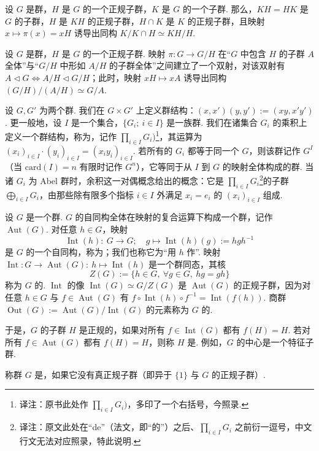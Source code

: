 \begin{proposition}\label{prop:fg-1-1-11}
设 $G$ 是群，$H$ 是 $G$ 的一个正规子群，$K$ 是 $G$ 的一个子群. 那么，$KH=HK$ 是 $G$ 的子群，$H$ 是 $KH$ 的正规子群，$H\cap K$ 是 $K$ 的正规子群，且映射 $x\mapsto\pi(x)=xH$ 诱导出同构 $K/K\cap H\simeq KH/H$.
\end{proposition}

\begin{proposition}\label{prop:fg-1-1-12}
设 $G$ 是群，$H$ 是 $G$ 的一个正规子群. 映射 $\pi:G\to G/H$ 在``$G$ 中包含 $H$ 的子群 $A$ 全体''与``$G/H$ 中形如 $A/H$ 的子群全体''之间建立了一个双射，对该双射有 $A\triangleleft G\Leftrightarrow A/H\triangleleft G/H$；此时，映射 $xH\mapsto xA$ 诱导出同构 $(G/H)/(A/H)\simeq G/A$.
\end{proposition}

\begin{numpara}[直积与直和]\label{np:fg-1-1-13}
设 $G,G'$ 为两个群. 我们在 $G\times G'$ 上定义群结构：$(x,x')(y,y'):=(xy,x'y')$. 更一般地，设 $I$ 是一个集合，$\{G_i;\ i\in I\}$ 是一族群. 我们在诸集合 $G_i$ 的乘积上定义一个群结构，称为，记作 $\prod_{i\in I}G_i)$\footnote{译注：原书此处作 $\prod_{i\in I}G_i)$，多印了一个右括号，今照录.}，其运算为 $(x_i)_{i\in I}\cdot(y_i)_{i\in I}=(x_iy_i)_{i\in I}$. 若所有的 $G_i$ 都等于同一个 $G$，则该群记作 $G^I$（当 $\mathrm{card}(I)=n$ 有限时记作 $G^n$），它等同于从 $I$ 到 $G$ 的映射全体构成的群. 当诸 $G_i$ 为 Abel 群时，余积这一对偶概念给出的概念：它是 $\prod_{i\in I}G_i$\footnote{译注：原文此处在``de''（法文，即``的''）之后、$\prod_{i\in I}G_i$ 之前衍一逗号，中文行文无法对应照录，特此说明.}的子群 $\bigoplus_{i\in I}G_i$，由那些除有限多个指标 $i\in I$ 外满足 $x_i=e_i$ 的 $(x_i)_{i\in I}$ 组成.
\end{numpara}

\begin{numpara}[内自同构与外自同构]\label{np:fg-1-1-14}
设 $G$ 是一个群. $G$ 的自同构全体在映射的复合运算下构成一个群，记作 $\operatorname{Aut}(G)$. 对任意 $h\in G$，映射
\[
\operatorname{Int}(h):\ G\to G;\quad g\mapsto\operatorname{Int}(h)(g):=hgh^{-1}
\]
是 $G$ 的一个自同构，称为；我们也称它为``用 $h$ 作''.
映射 $\operatorname{Int}:G\to\operatorname{Aut}(G):\ h\mapsto\operatorname{Int}(h)$ 是一个群同态，其核
\[
Z(G):=\{h\in G,\ \forall g\in G,\ hg=gh\}
\]
称为 $G$ 的. $\operatorname{Int}$ 的像 $\operatorname{Int}(G)\simeq G/Z(G)$ 是 $\operatorname{Aut}(G)$ 的正规子群，因为对任意 $h\in G$ 与 $f\in\operatorname{Aut}(G)$ 有 $f\circ\operatorname{Int}(h)\circ f^{-1}=\operatorname{Int}(f(h))$. 商群 $\operatorname{Out}(G):=\operatorname{Aut}(G)/\operatorname{Int}(G)$ 的元素称为 $G$ 的.

于是，$G$ 的子群 $H$ 是正规的，如果对所有 $f\in\operatorname{Int}(G)$ 都有 $f(H)=H$. 若对所有 $f\in\operatorname{Aut}(G)$ 都有 $f(H)=H$，则称 $H$ 是. 例如，$G$ 的中心是一个特征子群.
\end{numpara}

\begin{definition}\label{def:fg-1-1-15}
称群 $G$ 是，如果它没有真正规子群（即异于 $\{1\}$ 与 $G$ 的正规子群）.
\end{definition}
